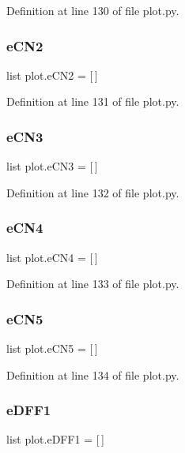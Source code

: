 Definition at line 130 of file plot.\+py.

\mbox{\label{namespaceplot_a928d5b9c10f05c3fa8d05f64ee6f5102}} 
\subsubsection{e\+C\+N2}
{\footnotesize\ttfamily list plot.\+e\+C\+N2 = [$\,$]}



Definition at line 131 of file plot.\+py.

\mbox{\label{namespaceplot_a57b26a177e8bd327e9368b9d111d86ec}} 
\subsubsection{e\+C\+N3}
{\footnotesize\ttfamily list plot.\+e\+C\+N3 = [$\,$]}



Definition at line 132 of file plot.\+py.

\mbox{\label{namespaceplot_ab96672b27a4558a6c276053f39308644}} 
\subsubsection{e\+C\+N4}
{\footnotesize\ttfamily list plot.\+e\+C\+N4 = [$\,$]}



Definition at line 133 of file plot.\+py.

\mbox{\label{namespaceplot_ad74e62df27a35d761e2b57787020532f}} 
\subsubsection{e\+C\+N5}
{\footnotesize\ttfamily list plot.\+e\+C\+N5 = [$\,$]}



Definition at line 134 of file plot.\+py.

\mbox{\label{namespaceplot_ae53685253135440993516252c008776b}} 
\subsubsection{e\+D\+F\+F1}
{\footnotesize\ttfamily list plot.\+e\+D\+F\+F1 = [$\,$]}



